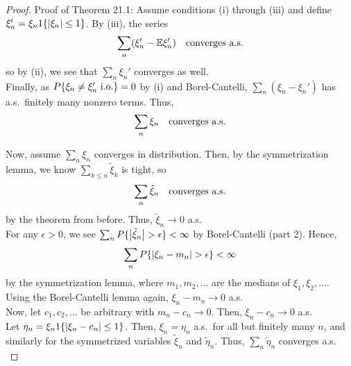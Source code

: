 \begin{proof}{Proof of Theorem 21.1:}
    Assume conditions (i) through (iii) and define $\xi_n' = \xi_n1\{\abs{\xi_n} \leq 1\}$. By (iii), the series
    \[ \sum_n(\xi_n' - \mathbb{E}\xi_n') \quad \tt{converges a.s.} \]
    so by (ii), we see that $\sum_n \xi_n'$ converges as well.\\

    Finally, as $P\{\xi_n \neq \xi_n' \tt{ i.o.}\} = 0$ by (i) and Borel-Cantelli, $\sum_n(\xi_n - \xi_n')$ has a.s.\ finitely many nonzero terms. Thus,
    \[ \sum_n \xi_n \quad \tt{converges a.s.} \]

    Now, assume $\sum_n \xi_n$ converges in distribution. Then, by the symmetrization lemma, we know $\sum_{k \leq n} \tilde{\xi}_k$ is tight, so
    \[ \sum_n \tilde{\xi}_n \quad \tt{converges a.s.} \]
    by the theorem from before. Thus, $\tilde{\xi}_n \to 0$ a.s.\\

    For any $\epsilon > 0$, we see $\sum_n P\{\abs{\tilde{\xi}_n} > \epsilon\} < \infty$ by Borel-Cantelli (part 2). Hence,
    \[ \sum_n P\{\abs{\xi_n - m_n} > \epsilon\} < \infty \]
    by the symmetrization lemma, where $m_1, m_2, \ldots$ are the medians of $\xi_1, \xi_2, \ldots$. Using the Borel-Cantelli lemma again, $\xi_n - m_n \to 0$ a.s.\\

    Now, let $c_1, c_2, \ldots$ be arbitrary with $m_n - c_n \to 0$. Then, $\xi_n - c_n \to 0$ a.s.\\

    Let $\eta_n = \xi_n1\{\abs{\xi_n - c_n} \leq 1\}$. Then, $\xi_n = \eta_n$ a.s.\ for all but finitely many $n$, and similarly for the symmetrized variables $\tilde{\xi}_n$ and $\tilde{\eta}_n$. Thus, $\sum_n \tilde{\eta}_n$ converges a.s.\\


\end{proof}
